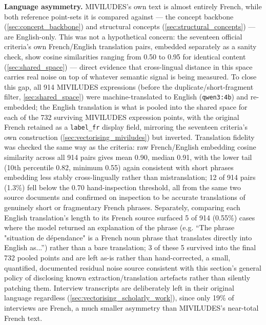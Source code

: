 \textbf{Language asymmetry.} MIVILUDES's own text is almost entirely French, while both reference point-sets it is compared against — the concept backbone (\ref{sec:concept_backbone}) and structural concepts (\ref{sec:structural_concepts}) — are English-only. This was not a hypothetical concern: the seventeen official criteria's own French/English translation pairs, embedded separately as a sanity check, show cosine similarities ranging from 0.50 to 0.95 for identical content (\ref{sec:shared_space}) — direct evidence that cross-lingual distance in this space carries real noise on top of whatever semantic signal is being measured. To close this gap, all 914 MIVILUDES expressions (before the duplicate/short-fragment filter, \ref{sec:shared_space}) were machine-translated to English (\texttt{qwen3:4b}) and re-embedded; the English translation is what is pooled into the shared space for each of the 732 surviving MIVILUDES expression points, with the original French retained as a \texttt{label\_fr} display field, mirroring the seventeen criteria's own construction (\ref{sec:vectorising_miviludes}) but inverted. Translation fidelity was checked the same way as the criteria: raw French/English embedding cosine similarity across all 914 pairs gives mean 0.90, median 0.91, with the lower tail (10th percentile 0.82, minimum 0.55) again consistent with short phrases embedding less stably cross-lingually rather than mistranslation; 12 of 914 pairs (1.3\%) fell below the 0.70 hand-inspection threshold, all from the same two source documents and confirmed on inspection to be accurate translations of genuinely short or fragmentary French phrases. Separately, comparing each English translation's length to its French source surfaced 5 of 914 (0.55\%) cases where the model returned an explanation of the phrase (e.g. \enquote{The phrase "situation de dépendance" is a French noun phrase that translates directly into English as...}) rather than a bare translation; 3 of these 5 survived into the final 732 pooled points and are left as-is rather than hand-corrected, a small, quantified, documented residual noise source consistent with this section's general policy of disclosing known extraction/translation artefacts rather than silently patching them. Interview transcripts are deliberately left in their original language regardless (\ref{sec:vectorising_scholarly_work}), since only 19\% of interviews are French, a much smaller asymmetry than MIVILUDES's near-total French text.

